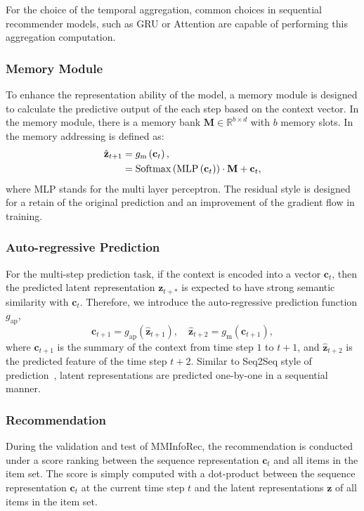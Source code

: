 \documentclass[conference]{IEEEtran}
\begin{document}
For the choice of the temporal aggregation, common choices in sequential recommender models, such as GRU or Attention are capable of performing this aggregation computation.

\subsubsection{Memory Module}
To enhance the representation ability of the model, a memory module is designed to calculate the predictive output of the each step based on the context vector. In the memory module, there is a memory bank $\mathbf{M}\in\mathbb{R}^{b \times d}$ with $b$ memory slots. In the memory addressing is defined as:
\begin{align}
\label{eq:mem}
    \hat{\mathbf{z}}_{t+1}&=g_\text{m}\left(\mathbf{c}_{t}\right),\notag\\
    &=\operatorname{Softmax}\left(\operatorname{MLP}\left(\mathbf{c}_{t}\right)\right)\cdot\mathbf{M}+\mathbf{c}_{t},
\end{align}
where MLP stands for the multi layer perceptron. The residual style is designed for a retain of the original prediction and an improvement of the gradient flow in training.

\subsubsection{Auto-regressive Prediction}
For the multi-step prediction task, if the context is encoded into a vector $\mathbf{c}_t$, then the predicted latent representation $\mathbf{z}_{t+*}$ is expected to have strong semantic similarity with $\mathbf{c}_t$. Therefore, we introduce the auto-regressive prediction function $g_\text{ap}$,
\begin{equation}
\mathbf{c}_{t+1}=g_\text{ap}\left(\hat{\mathbf{z}}_{t+1}\right),\quad\hat{\mathbf{z}}_{t+2}=g_\text{m}\left(\mathbf{c}_{t+1}\right),
\end{equation}
where $\mathbf{c}_{t+1}$ is the summary of the context from time step $1$ to $t+1$, and $\hat{\mathbf{z}}_{t+2}$ is the predicted feature of the time step $t+2$. Similar to Seq2Seq style of prediction~\cite{seq2seq,zhou2020contrastive}, latent representations are predicted one-by-one in a sequential manner.

\subsubsection{Recommendation}
During the validation and test of MMInfoRec, the recommendation is conducted under a score ranking between the sequence representation $\mathbf{c}_t$ and all items in the item set. The score is simply computed with a dot-product between the sequence representation $\mathbf{c}_t$ at the current time step $t$ and the latent representations $\mathbf{z}$ of all items in the item set.
\end{document}
